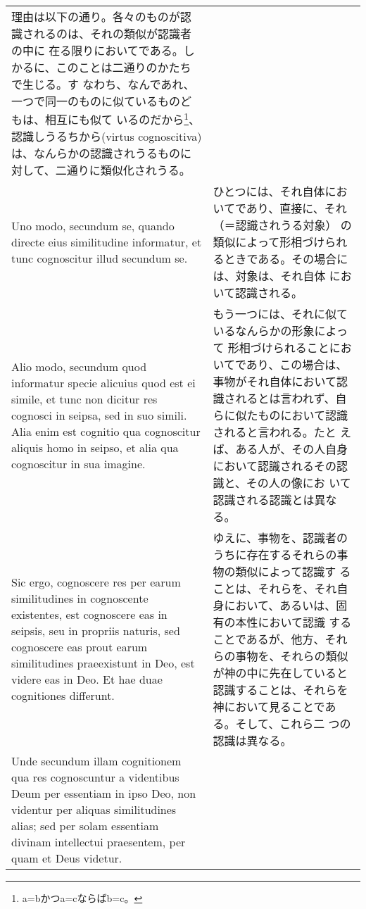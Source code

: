 \documentclass[10pt]{jsarticle} %
\begin{document}
\begin{longtable}{p{21em}p{21em}}
理由は以下の通り。各々のものが認識されるのは、それの類似が認識者の中に
在る限りにおいてである。しかるに、このことは二通りのかたちで生じる。す
なわち、なんであれ、一つで同一のものに似ているものどもは、相互にも似て
いるのだから\footnote{a=bかつa=cならばb=c。}、認識しうるちから(virtus cognoscitiva)
は、なんらかの認識されうるものに対して、二通りに類似化されうる。

\\

Uno modo, secundum se, quando directe eius similitudine informatur, et
tunc cognoscitur illud secundum se.

&

ひとつには、それ自体においてであり、直接に、それ（＝認識されうる対象）
の類似によって形相づけられるときである。その場合には、対象は、それ自体
において認識される。

\\

Alio
modo, secundum quod informatur specie alicuius quod est ei simile, et
tunc non dicitur res cognosci in seipsa, sed in suo simili. Alia enim
est cognitio qua cognoscitur aliquis homo in seipso, et alia qua
cognoscitur in sua imagine.

&

もう一つには、それに似ているなんらかの形象によって
形相づけられることにおいてであり、この場合は、事物がそれ自体において認
識されるとは言われず、自らに似たものにおいて認識されると言われる。たと
えば、ある人が、その人自身において認識されるその認識と、その人の像にお
いて認識される認識とは異なる。

\\

Sic ergo, cognoscere res per earum similitudines in cognoscente
existentes, est cognoscere eas in seipsis, seu in propriis naturis,
sed cognoscere eas prout earum similitudines praeexistunt in Deo, est
videre eas in Deo. Et hae duae cognitiones differunt. 

&

ゆえに、事物を、認識者のうちに存在するそれらの事物の類似によって認識す
ることは、それらを、それ自身において、あるいは、固有の本性において認識
することであるが、他方、それらの事物を、それらの類似が神の中に先在していると
認識することは、それらを神において見ることである。そして、これら二
つの認識は異なる。

\\

Unde secundum illam cognitionem qua res cognoscuntur a videntibus Deum
per essentiam in ipso Deo, non videntur per aliquas similitudines
alias; sed per solam essentiam divinam intellectui praesentem, per
quam et Deus videtur.


\end{longtable}
\end{document}
